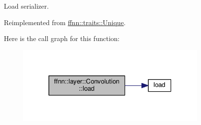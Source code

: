 Load serializer. 



Reimplemented from \hyperlink{classffnn_1_1traits_1_1_unique_af1e937c2908ed2ff707d6a7d1b5b13d2}{ffnn\-::traits\-::\-Unique}.



Here is the call graph for this function\-:
\nopagebreak
\begin{figure}[H]
\begin{center}
\leavevmode
\includegraphics[width=270pt]{classffnn_1_1layer_1_1_convolution_a1af5c3efa427ad1dddccb3ac3f82b325_cgraph}
\end{center}
\end{figure}


